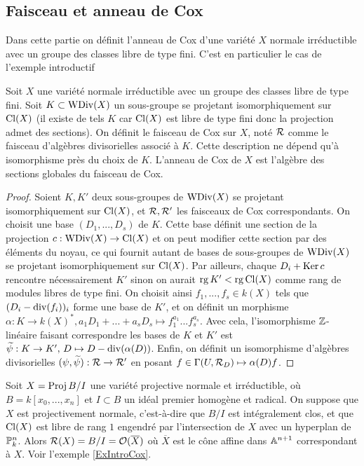 \subsection{Faisceau et anneau de Cox}

Dans cette partie on définit l'anneau de Cox d'une variété $X$ normale irréductible avec un groupe des classes libre de type fini. C'est en particulier le cas de l'exemple introductif

\begin{cons}\label{consFreeCoxRing}
Soit $X$ une variété normale irréductible avec un groupe des classes libre de type fini. Soit $K\subset \operatorname{WDiv}(X)$ un sous-groupe se projetant isomorphiquement sur $\operatorname{Cl}(X)$ (il existe de tels $K$ car $\operatorname{Cl}(X)$ est libre de type fini donc la projection admet des sections). On définit le faisceau de Cox sur $X$, noté $\mathcal{R}$ comme le faisceau d'algèbres divisorielles associé à $K$. Cette description ne dépend qu'à isomorphisme près du choix de $K$. L'anneau de Cox de $X$ est l'algèbre des sections globales du faisceau de Cox. 
\end{cons}
\begin{proof}
Soient $K,K'$ deux sous-groupes de $\operatorname{WDiv}(X)$ se projetant isomorphiquement sur $\operatorname{Cl}(X)$, et $\mathcal{R},\mathcal{R}'$ les faisceaux de Cox correspondants. On choisit une base $(D_1,...,D_s)$ de $K$. Cette base définit une section de la projection $c:\operatorname{WDiv}(X)\rightarrow \operatorname{Cl}(X)$ et on peut modifier cette section par des éléments du noyau, ce qui fournit autant de bases de sous-groupes de $\operatorname{WDiv}(X)$ se projetant isomorphiquement sur $\operatorname{Cl}(X)$. Par ailleurs, chaque $D_i+\operatorname{Ker} c$ rencontre nécessairement $K'$ sinon on aurait $\operatorname{rg} K' < \operatorname{rg} \operatorname{Cl}(X)$ comme rang de modules libres de type fini. On choisit ainsi $f_1,...,f_s\in k(X)$ tels que $(D_i-\operatorname{div}(f_i))_i$ forme une base de $K'$, et on définit un morphisme $\alpha:K\rightarrow k(X)^*, a_1D_1+...+a_sD_s\mapsto f_1^{a_1}...f_s^{a_s}$. Avec cela, l'isomorphisme $\mathbb{Z}$-linéaire faisant correspondre les bases de $K$ et $K'$ est $\widetilde{\psi}:K\rightarrow K',\, D\mapsto D-\operatorname{div}(\alpha(D))$. Enfin, on définit un isomorphisme d'algèbres divisorielles $(\psi, \widetilde{\psi}): \mathcal{R}\rightarrow\mathcal{R}'$ en posant $f\in \Gamma(U, \mathcal{R}_D)\mapsto \alpha(D)f$.
\end{proof}

\begin{ex}
Soit $X=\operatorname{Proj} B/I$ une variété projective normale et irréductible, où $B=k[x_0,...,x_n]$ et $I\subset B$ un idéal premier homogène et radical. On suppose que $X$ est projectivement normale, c'est-à-dire que $B/I$ est intégralement clos, et que $\operatorname{Cl}(X)$ est libre de rang $1$ engendré par l'intersection de $X$ avec un hyperplan de $\mathbb{P}^n_k$. Alors $\mathcal{R}(X)=B/I=\mathcal{O}(\overline{X})$ où $\overline{X}$ est le cône affine dans $\mathbb{A}^{n+1}$ correspondant à $X$. Voir l'exemple \ref{ExIntroCox}.
\end{ex}

